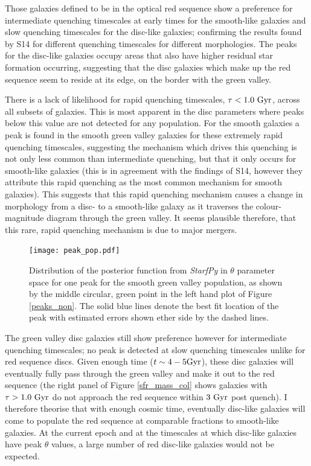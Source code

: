 \documentclass{mn2e}
\begin{document}
Those galaxies defined to be in the optical red sequence show a preference for intermediate quenching timescales at early times for the smooth-like galaxies and slow quenching timescales for the disc-like galaxies; confirming the results found by S14 for different quenching timescales for different morphologies. The peaks for the disc-like galaxies occupy areas that also have higher residual star formation occurring, suggesting that the disc galaxies which make up the red sequence seem to reside at its edge, on the border with the green valley. 

There is a lack of likelihood for rapid quenching timescales, $\tau < 1.0~\rm{Gyr}$, across all subsets of galaxies. This is most apparent in the disc parameters %
where peaks below this value are not detected for any population. For the smooth galaxies a peak is found in the smooth green valley galaxies for these extremely rapid quenching timescales, suggesting the mechanism which drives this quenching is not only less common than intermediate quenching, but that it only occurs for smooth-like galaxies (this is in agreement with the findings of S14, however they attribute this rapid quenching as the most common mechanism for smooth galaxies). This suggests that this rapid quenching mechanism causes a change in morphology from a disc- to a smooth-like galaxy as it traverses the colour-magnitude diagram through the green valley. It seems plausible therefore, that this rare, rapid quenching mechanism is due to major mergers.

\begin{figure}
\texttt{[image: peak\_pop.pdf]}
\caption{Distribution of the posterior function from \emph{StarfPy} in $\theta$ parameter space for one peak for the smooth green valley population, as shown by the middle circular, green point in the left hand plot of Figure \ref{peaks_non}. The solid blue lines denote the best fit location of the peak with estimated errors shown ether side by the dashed lines.}
\label{peak_pop}
\end{figure}

The green valley disc galaxies still show preference however for intermediate quenching timescales; no peak is detected at slow quenching timescales unlike for red sequence discs. Given enough time ($t\sim4-5\rm{Gyr}$), these disc galaxies will eventually fully pass through the green valley and make it out to the red sequence (the right panel of Figure \ref{sfr_mass_col} shows galaxies with $\tau > 1.0~\rm{Gyr}$ do not approach the red sequence within $3~\rm{Gyr}$ post quench). I therefore theorise that with enough cosmic time, eventually disc-like galaxies will come to populate the red sequence at comparable fractions to smooth-like galaxies. At the current epoch and at the timescales at which disc-like galaxies have peak $\theta$ values, a large number of red disc-like galaxies would not be expected. 
\end{document}
